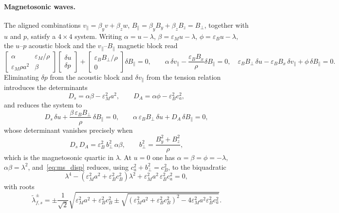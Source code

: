 \documentclass[a4paper,fleqn]{cas-sc}
\theoremstyle{remark}
\newcommand{\eps}{\varepsilon}
\newcommand{\epsM}{\eps_{M}}
\newcommand{\epsB}{\eps_{B}}
\begin{document}
\paragraph{Magnetosonic waves.}
The aligned combinations $v_\parallel=\beta_y v+\beta_z w$,
$B_\parallel=\beta_y B_y+\beta_z B_z=B_\perp$, together with $u$ and $p$, satisfy a
$4\times4$ system. Writing $\alpha=u-\lambda$, $\beta=\epsM u-\lambda$,
$\phi=\epsB u-\lambda$, the $u$--$p$ acoustic block and the
$v_\parallel$--$B_\parallel$ magnetic block read
\begin{equation}
\begin{bmatrix}\alpha & \epsM/\rho\\ \epsM\rho a^2 & \beta\end{bmatrix}
\!\begin{bmatrix}\delta u\\ \delta p\end{bmatrix}
+\begin{bmatrix}\epsB B_\perp/\rho\\ 0\end{bmatrix}\!\delta B_\parallel=0,
\qquad
\alpha\,\delta v_\parallel-\frac{\epsB B_x}{\rho}\delta B_\parallel=0,
\quad
\epsB B_\perp\,\delta u-\epsB B_x\,\delta v_\parallel+\phi\,\delta B_\parallel=0.
\end{equation}
Eliminating $\delta p$ from the acoustic block and $\delta v_\parallel$ from the
tension relation introduces the determinants
\begin{equation}
\label{eq:DsDA}
D_s=\alpha\beta-\epsM^2a^2,\qquad
D_A=\alpha\phi-\epsB^2c_a^2,
\end{equation}
and reduces the system to
\begin{equation}
\label{eq:ms_reduced}
D_s\,\delta u+\frac{\beta\,\epsB B_\perp}{\rho}\,\delta B_\parallel=0,
\qquad
\alpha\,\epsB B_\perp\,\delta u+D_A\,\delta B_\parallel=0,
\end{equation}
whose determinant vanishes precisely when
\begin{equation}
\label{eq:ms_disp}
D_s\,D_A=\epsB^2\,b_\perp^2\,\alpha\beta,\qquad b_\perp^2=\frac{B_y^2+B_z^2}{\rho},
\end{equation}
which is the magnetosonic quartic in $\lambda$. At $u=0$ one has
$\alpha=\beta=\phi=-\lambda$, $\alpha\beta=\lambda^2$, and~\eqref{eq:ms_disp}
reduces, using $c_a^2+b_\perp^2=c_B^2$, to the biquadratic
\begin{equation}
\label{eq:biquad}
\lambda^4-(\epsM^2a^2+\epsB^2c_B^2)\lambda^2+\epsM^2a^2\,\epsB^2c_a^2=0,
\end{equation}
with roots
\begin{equation}
\label{eq:ms_eig}
\tilde\lambda_{f,s}^{\pm}=\pm\frac{1}{\sqrt2}
\sqrt{\epsM^2a^2+\epsB^2c_B^2\pm\sqrt{(\epsM^2a^2+\epsB^2c_B^2)^2-4\epsM^2a^2\epsB^2c_a^2}}.
\end{equation}
\end{document}
